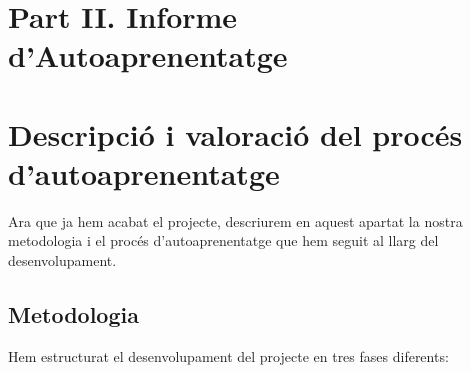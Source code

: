 \section*{\centering Part II. Informe d'Autoaprenentatge}

\section{Descripció i valoració del procés d'autoaprenentatge}

Ara que ja hem acabat el projecte, descriurem en aquest apartat la nostra metodologia i el procés d'autoaprenentatge que hem seguit al llarg del desenvolupament.

\subsection{Metodologia}
Hem estructurat el desenvolupament del projecte en tres fases diferents:

